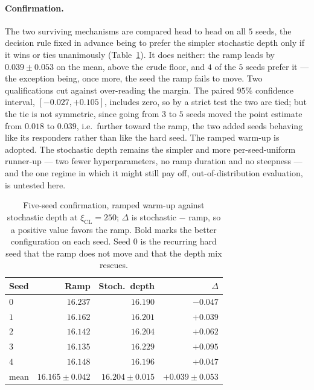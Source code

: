 \documentclass[letterpaper]{article} %
\begin{document}
\paragraph{Confirmation.}
The two surviving mechanisms are compared head to head on all $5$ seeds, the decision rule fixed in advance being to prefer the simpler stochastic depth only if it wins or ties unanimously (Table~\ref{tab:clconf}). It does neither: the ramp leads by $0.039 \pm 0.053$ on the mean, above the crude floor, and $4$ of the $5$ seeds prefer it --- the exception being, once more, the seed the ramp fails to move. Two qualifications cut against over-reading the margin. The paired $95\%$ confidence interval, $[-0.027, +0.105]$, includes zero, so by a strict test the two are tied; but the tie is not symmetric, since going from $3$ to $5$ seeds moved the point estimate from $0.018$ to $0.039$, i.e.\ further toward the ramp, the two added seeds behaving like its responders rather than like the hard seed. The ramped warm-up is adopted. The stochastic depth remains the simpler and more per-seed-uniform runner-up --- two fewer hyperparameters, no ramp duration and no steepness --- and the one regime in which it might still pay off, out-of-distribution evaluation, is untested here.

\begin{table}[t]
\centering
\footnotesize
\setlength{\tabcolsep}{4pt}
\begin{tabular}{lrrr}
\toprule
\textbf{Seed} & \textbf{Ramp} & \textbf{Stoch.\ depth} & \textbf{$\Delta$} \\
\midrule
$0$ & $16.237$ & $\mathbf{16.190}$ & $-0.047$ \\
$1$ & $\mathbf{16.162}$ & $16.201$ & $+0.039$ \\
$2$ & $\mathbf{16.142}$ & $16.204$ & $+0.062$ \\
$3$ & $\mathbf{16.135}$ & $16.229$ & $+0.095$ \\
$4$ & $\mathbf{16.148}$ & $16.196$ & $+0.047$ \\
\midrule
mean & $\mathbf{16.165} \pm 0.042$ & $16.204 \pm 0.015$ & $+0.039 \pm 0.053$ \\
\bottomrule
\end{tabular}
\caption{Five-seed confirmation, ramped warm-up against stochastic depth at $\xi_{\mathrm{CL}} = 250$; $\Delta$ is stochastic $-$ ramp, so a positive value favors the ramp. Bold marks the better configuration on each seed. Seed $0$ is the recurring hard seed that the ramp does not move and that the depth mix rescues.}
\label{tab:clconf}
\end{table}
\end{document}
